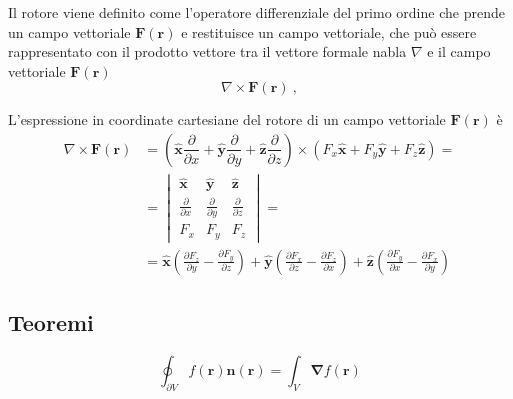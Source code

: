 \begin{definition}[Rotore] Il rotore viene definito come l'operatore differenziale del primo ordine che prende un campo vettoriale $\mathbf{F}(\mathbf{r})$ e restituisce un campo vettoriale, che può essere rappresentato con il prodotto vettore tra il vettore formale nabla $\nabla$ e il campo vettoriale $\mathbf{F}(\mathbf{r})$
    \begin{equation}
        \nabla \times \mathbf{F}(\mathbf{r}) \ ,
    \end{equation}
\end{definition}
\begin{property}
L'espressione in coordinate cartesiane del rotore di un campo vettoriale $\mathbf{F}(\mathbf{r})$ è
    \begin{equation}
        \begin{aligned}
            \nabla \times \mathbf{F}(\mathbf{r}) & = \left( \mathbf{\hat{x}} \dfrac{\partial}{\partial x} + \mathbf{\hat{y}} \dfrac{\partial}{\partial y} + \mathbf{\hat{z}} \dfrac{\partial}{\partial z} \right) \times (F_x \mathbf{\hat{x}} + F_y \mathbf{\hat{y}} + F_z \mathbf{\hat{z}} ) = \\
            & = \begin{vmatrix} \mathbf{\hat{x}} & \mathbf{\hat{y}} & \mathbf{\hat{z}} \\
            \frac{\partial}{\partial x} & \frac{\partial}{\partial y} & \frac{\partial}{\partial z} \\
            F_x & F_y & F_z \end{vmatrix} = \\
            & = \mathbf{\hat{x}} \left( \frac{\partial F_z}{\partial y} - \frac{\partial F_y}{\partial z} \right) +  
                \mathbf{\hat{y}} \left( \frac{\partial F_x}{\partial z} - \frac{\partial F_z}{\partial x} \right) +  
                \mathbf{\hat{z}} \left( \frac{\partial F_y}{\partial x} - \frac{\partial F_x}{\partial y} \right)    
        \end{aligned}
    \end{equation}
\end{property}
\begin{property}
\end{property}


\subsection{Teoremi}
\begin{theorem}
    \begin{equation}
        \oint_{\partial V} f(\mathbf{r}) \mathbf{\hat{n}}(\mathbf{r}) = \int_V \mathbf{\nabla} f(\mathbf{r})
    \end{equation}
\end{theorem}

